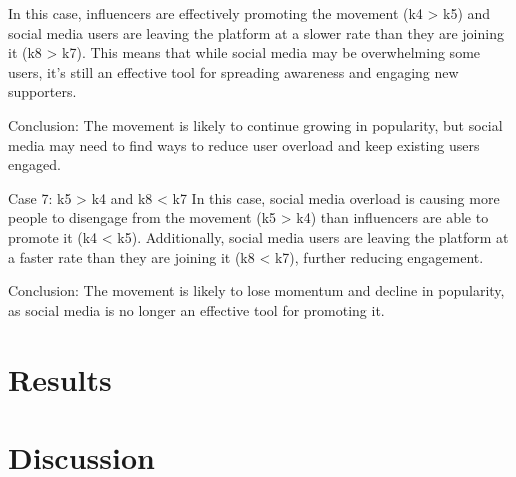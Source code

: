 \documentclass{article}
\begin{document}
In this case, influencers are effectively promoting the movement (k4 > k5) and social media users are leaving the platform at a slower rate than they are joining it (k8 > k7). This means that while social media may be overwhelming some users, it's still an effective tool for spreading awareness and engaging new supporters.

Conclusion: The movement is likely to continue growing in popularity, but social media may need to find ways to reduce user overload and keep existing users engaged.

Case 7: k5 > k4 and k8 < k7
In this case, social media overload is causing more people to disengage from the movement (k5 > k4) than influencers are able to promote it (k4 < k5). Additionally, social media users are leaving the platform at a faster rate than they are joining it (k8 < k7), further reducing engagement.

Conclusion: The movement is likely to lose momentum and decline in popularity, as social media is no longer an effective tool for promoting it.

    \section{Results}
    \section{Discussion}
    \newpage
    
    
    
\end{document}
